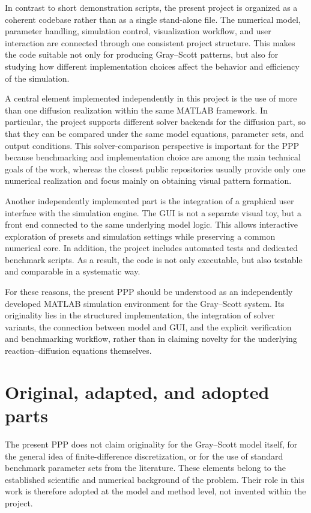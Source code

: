 In contrast to short demonstration scripts, the present project is organized as a coherent codebase rather than as a single stand-alone file. The numerical model, parameter handling, simulation control, visualization workflow, and user interaction are connected through one consistent project structure. This makes the code suitable not only for producing Gray--Scott patterns, but also for studying how different implementation choices affect the behavior and efficiency of the simulation.

A central element implemented independently in this project is the use of more than one diffusion realization within the same MATLAB framework. In particular, the project supports different solver backends for the diffusion part, so that they can be compared under the same model equations, parameter sets, and output conditions. This solver-comparison perspective is important for the PPP because benchmarking and implementation choice are among the main technical goals of the work, whereas the closest public repositories usually provide only one numerical realization and focus mainly on obtaining visual pattern formation.

Another independently implemented part is the integration of a graphical user interface with the simulation engine. The GUI is not a separate visual toy, but a front end connected to the same underlying model logic. This allows interactive exploration of presets and simulation settings while preserving a common numerical core. In addition, the project includes automated tests and dedicated benchmark scripts. As a result, the code is not only executable, but also testable and comparable in a systematic way.

For these reasons, the present PPP should be understood as an independently developed MATLAB simulation environment for the Gray--Scott system. Its originality lies in the structured implementation, the integration of solver variants, the connection between model and GUI, and the explicit verification and benchmarking workflow, rather than in claiming novelty for the underlying reaction--diffusion equations themselves.

\section{Original, adapted, and adopted parts}

The present PPP does not claim originality for the Gray--Scott model itself, for the general idea of finite-difference discretization, or for the use of standard benchmark parameter sets from the literature. These elements belong to the established scientific and numerical background of the problem. Their role in this work is therefore adopted at the model and method level, not invented within the project.

